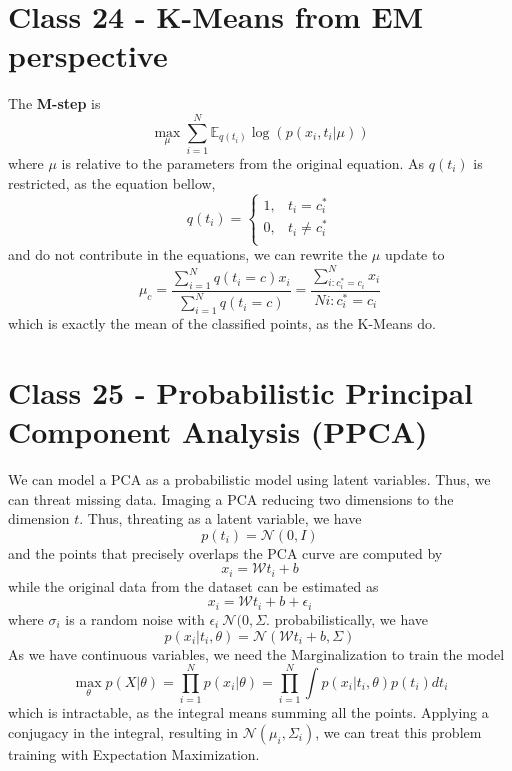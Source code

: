 \documentclass{article}
\begin{document}
\section{Class 24 - K-Means from EM perspective}
The \textbf{M-step} is
\begin{equation}
    \max_\mu \sum_{i=1}^N \mathbb{E}_{q(t_i)} \log(p(x_i, t_i|\mu))
\end{equation}
where $\mu$ is relative to the parameters from the original equation. As $q(t_i)$ is restricted, as the equation bellow,
\begin{equation}
    q(t_i) = \begin{cases}
    1, & t_i = c_i^*\\
    0, & t_i \neq c_i^*\\
    \end{cases}
\end{equation}
and do not contribute in the equations, we can rewrite the $\mu$ update to
\begin{equation}
    \mu_c = \frac{\sum_{i=1}^N q(t_i = c)x_i}{\sum_{i=1}^N q(t_i = c)} = \frac{\sum_{i: c_i^*=c_i}^N x_i}{N i: c_i^*=c_i }
\end{equation}
which is exactly the mean of the classified points, as the K-Means do.

\section{Class 25 - Probabilistic Principal Component Analysis (PPCA)}
We can model a PCA as a probabilistic model using latent variables. Thus, we can threat missing data. Imaging a PCA reducing two dimensions to the dimension $t$. Thus, threating as a latent variable, we have
\begin{equation}
    p(t_i) = \mathcal{N}(0, I)
\end{equation}
and the points that precisely overlaps the PCA curve are computed by
\begin{equation}
    x_i = \mathcal{W}t_i + b
\end{equation}
while the original data from the dataset can be estimated as 
\begin{equation}
    x_i = \mathcal{W}t_i + b + \epsilon_i
\end{equation}
where $\sigma_i$ is a random noise with $\epsilon_i ~ \mathcal{N}(0, \Sigma$. probabilistically, we have
\begin{equation}
    p(x_i|t_i, \theta) = \mathcal{N}(\mathcal{W}t_i + b, \Sigma)
\end{equation}
As we have continuous variables, we need the Marginalization to train the model
\begin{equation}
    \max_\theta p(X|\theta) = \prod_{i=1}^N p(x_i|\theta) = \prod_{i=1}^N \int p(x_i|t_i, \theta)p(t_i)dt_i
\end{equation}
which is intractable, as the integral means summing all the points. Applying a conjugacy in the integral, resulting in $\mathcal{N}(\mu_i, \Sigma_i)$, we can treat this problem training with Expectation Maximization.
\end{document}
